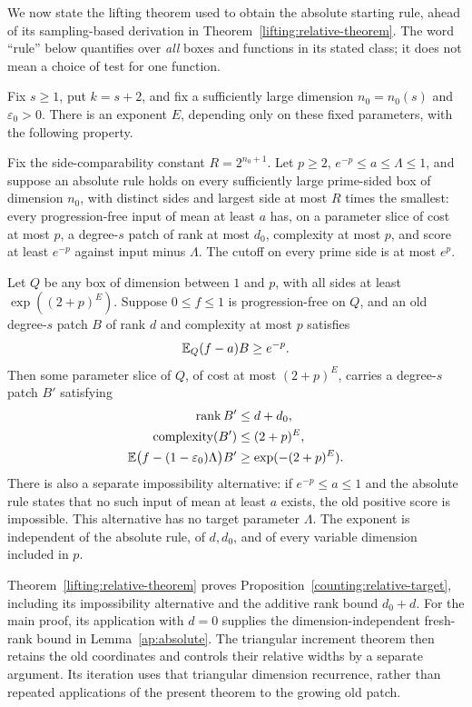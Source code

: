 We now state the lifting theorem used to obtain the absolute starting
rule, ahead of its
sampling-based derivation in Theorem~\ref{lifting:relative-theorem}.
The word ``rule'' below quantifies over \emph{all} boxes and functions
in its stated class; it does not mean a choice of test for one function.

\begin{proposition}
\label{counting:relative-target}
Fix $s\ge1$, put $k=s+2$, and fix a sufficiently large dimension $n_0=n_0(s)$ and
$\varepsilon_0>0$.  There is an exponent $E$, depending
only on these fixed parameters, with the following property.

Fix the side-comparability constant $R=2^{n_0+1}$.
Let $p\geq2$, $e^{-p}\leq a\leq\Lambda\leq1$, and suppose an absolute
rule holds on every sufficiently large prime-sided box of
dimension $n_0$, with distinct sides and largest side at most $R$ times
the smallest: every progression-free input of mean at least $a$ has,
on a parameter slice of cost at most $p$, a degree-$s$ patch of rank at
most $d_0$, complexity at most $p$, and score at least $e^{-p}$ against
input minus $\Lambda$.  The cutoff on every prime side is at most $e^p$.

Let $Q$ be any box of dimension between $1$ and $p$, with all sides at least
$\exp((2+p)^E)$.  Suppose $0\leq f\leq1$ is progression-free on $Q$,
and an old degree-$s$ patch $B$ of rank $d$ and complexity at most $p$
satisfies
\[
 \mathbb E_Q(f-a)B\geq e^{-p}.
\]
Then some parameter slice of $Q$, of cost at most $(2+p)^E$,
carries a degree-$s$ patch $B'$ satisfying
\begin{align*}
 \operatorname{rank} B'&\leq d+d_0,\\
 \text{complexity}(B')&\leq(2+p)^E,\\
 \mathbb E\bigl(f-(1-\varepsilon_0)\Lambda\bigr)B'
 &\geq\exp(-(2+p)^E).
\end{align*}
There is also a separate impossibility alternative: if
$e^{-p}\leq a\leq1$ and the absolute rule states that no such input
of mean at least $a$ exists, the old positive score is impossible.
This alternative has no target parameter $\Lambda$.  The exponent is independent of the absolute
rule, of $d,d_0$, and of every variable dimension included in $p$.
\end{proposition}

\begin{remark}\label{counting:status}
Theorem~\ref{lifting:relative-theorem} proves
Proposition~\ref{counting:relative-target}, including its impossibility
alternative and the additive rank bound $d_0+d$.
For the main proof, its application with $d=0$ supplies the
dimension-independent fresh-rank bound in Lemma~\ref{ap:absolute}.
The triangular increment theorem then retains the old coordinates
and controls their relative widths by a separate argument. Its
iteration uses that triangular dimension recurrence, rather than
repeated applications of the present theorem to the growing old patch.
\end{remark}
